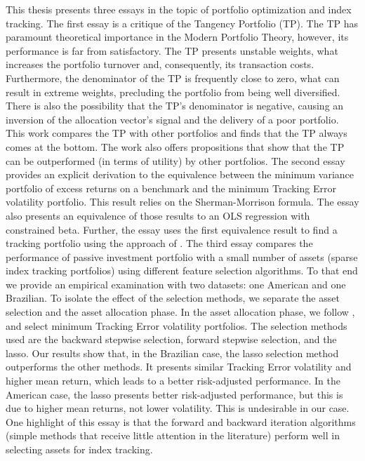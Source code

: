 \documentclass[12pt,oneside,a4paper]{memoir}
\begin{document}
\noindent
This thesis presents three essays in the topic of portfolio optimization and index tracking.
The first essay is a critique of the Tangency Portfolio (TP).
The TP has paramount theoretical importance in the Modern Portfolio Theory, however, its performance is far from satisfactory.
The TP presents unstable weights, what increases the portfolio turnover and, consequently, its transaction costs.
Furthermore, the denominator of the TP is frequently close to zero, what can result in extreme weights, precluding the portfolio from being well diversified.
There is also the possibility that the TP's denominator is negative, causing an inversion of the allocation vector's signal and the delivery of a poor portfolio.
This work compares the TP with other portfolios and finds that the TP always comes at the bottom.
The work also offers propositions that show that the TP can be outperformed (in terms of utility) by other portfolios.
The second essay provides an explicit derivation to the equivalence between the minimum variance portfolio of excess returns on a benchmark and the minimum Tracking Error volatility portfolio.
This result relies on the Sherman-Morrison formula.
The essay also presents an equivalence of those results to an OLS regression with constrained beta.
Further, the essay uses the first equivalence result to find a tracking portfolio using the approach of .
The third essay compares the performance of passive investment portfolio with a small number of assets (sparse index tracking portfolios) using different feature selection algorithms.
To that end we provide an empirical examination with two datasets: one American and one Brazilian.
To isolate the effect of the selection methods, we separate the asset selection and the asset allocation phase.
In the asset allocation phase, we follow , and select minimum Tracking Error volatility portfolios.
The selection methods used are the backward stepwise selection, forward stepwise selection, and the lasso.
Our results show that, in the Brazilian case, the lasso selection method outperforms the other methods.
It presents similar Tracking Error volatility and higher mean return, which leads to a better risk-adjusted performance.
In the American case, the lasso presents better risk-adjusted performance, but this is due to higher mean returns, not lower volatility.
This is undesirable in our case.
One highlight of this essay is that the forward and backward iteration algorithms (simple methods that receive little attention in the literature) perform well in selecting assets for index tracking.
\end{document}
